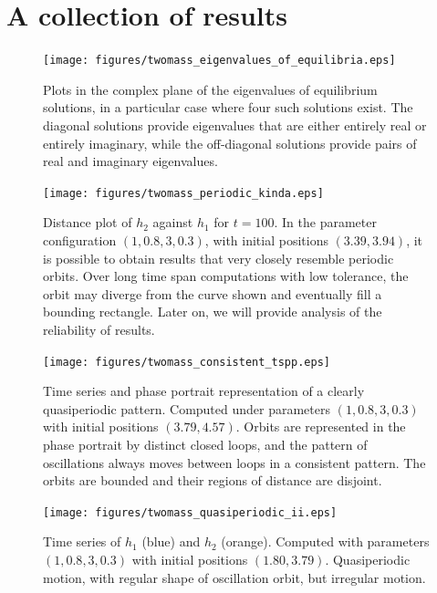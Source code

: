 \section{A collection of results}

\begin{figure}[h!]
    \centering
    \texttt{[image: figures/twomass\_eigenvalues\_of\_equilibria.eps]}
    \caption{
        Plots in the complex plane of the eigenvalues of equilibrium solutions,
        in a particular case where four such solutions exist.
        The diagonal solutions provide eigenvalues that are either entirely real or entirely imaginary,
        while the off-diagonal solutions provide pairs of real and imaginary eigenvalues.
    }
    \label{fig:twomass_argand_eigenvalues}
\end{figure}

\begin{figure}[h!]
    \centering
    \texttt{[image: figures/twomass\_periodic\_kinda.eps]}
    \caption{
        Distance plot of $h_2$ against $h_1$ for $t=100$.
        In the parameter configuration \((1,0.8,3,0.3)\), with initial positions $(3.39,3.94)$,
        it is possible to obtain results that very closely resemble periodic orbits.
        Over long time span computations with low tolerance, the orbit may diverge from the curve shown and eventually fill a bounding rectangle. Later on, we will provide analysis of the reliability of results.
    }
    \label{fig:twomass_semiperiodic}
\end{figure}

\begin{figure}[h!]
    \centering
    \texttt{[image: figures/twomass\_consistent\_tspp.eps]}
    \caption{
        Time series and phase portrait representation of a clearly quasiperiodic pattern.
        Computed under parameters $(1,0.8,3,0.3)$ with initial positions $(3.79,4.57)$.
        Orbits are represented in the phase portrait by distinct closed loops,
        and the pattern of oscillations always moves between loops in a consistent pattern.
        The orbits are bounded and their regions of distance are disjoint.
    }
    \label{fig:twomass_nice_orbits_tspp}
\end{figure}

\begin{figure}[h!]
    \centering
    \texttt{[image: figures/twomass\_quasiperiodic\_ii.eps]}
    \caption{
        Time series of $h_1$ (blue) and $h_2$ (orange).
        Computed with parameters $(1, 0.8, 3, 0.3)$ with initial positions $(1.80,3.79).$
        Quasiperiodic motion, with regular shape of oscillation orbit,
        but irregular motion.
    }
    \label{fig:twomass_generic_quasi}
\end{figure}

